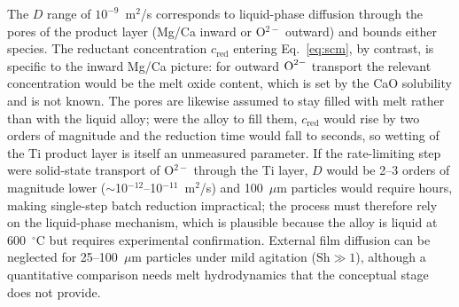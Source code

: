 \documentclass[pdflatex,sn-basic,Numbered]{sn-jnl}
\begin{document}
The $D$ range of $10^{-9}$~m$^2$/s corresponds to liquid-phase diffusion through the pores of the product layer (Mg/Ca inward or O$^{2-}$ outward) and bounds either species. The reductant concentration $c_{\mathrm{red}}$ entering Eq.~\ref{eq:scm}, by contrast, is specific to the inward Mg/Ca picture: for outward $\ce{O^{2-}}$ transport the relevant concentration would be the melt oxide content, which is set by the CaO solubility and is not known. The pores are likewise assumed to stay filled with melt rather than with the liquid alloy; were the alloy to fill them, $c_{\mathrm{red}}$ would rise by two orders of magnitude and the reduction time would fall to seconds, so wetting of the Ti product layer is itself an unmeasured parameter. If the rate-limiting step were solid-state transport of O$^{2-}$ through the Ti layer, $D$ would be 2--3 orders of magnitude lower ($\sim$10$^{-12}$--10$^{-11}$~m$^2$/s) and 100~$\mu$m particles would require hours, making single-step batch reduction impractical; the process must therefore rely on the liquid-phase mechanism, which is plausible because the alloy is liquid at 600~$^{\circ}$C but requires experimental confirmation. External film diffusion can be neglected for 25--100~$\mu$m particles under mild agitation ($\mathrm{Sh} \gg 1$), although a quantitative comparison needs melt hydrodynamics that the conceptual stage does not provide.
\end{document}
